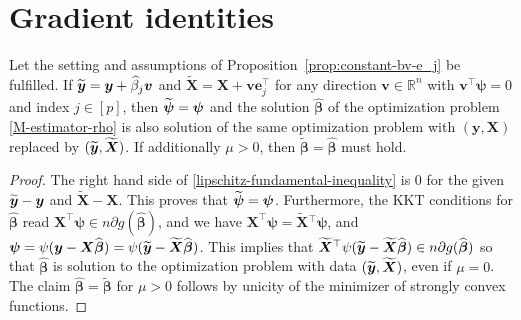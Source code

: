 \documentclass[11pt]{amsart}
\numberwithin{equation}{section}
\numberwithin{equation}{section}
\def\real{{\mathbb{R}}}
\def\R{{\real}}
\def\mathbold{\boldsymbol} %
\def\be{\mathbold{e}}
\def\bv{\mathbold{v}}\def\vhat{\widehat{v}}\def\vtil{\widetilde{v}}\def\vbar{{\overline v}}
\def\bX{\mathbold{X}}\def\hbX{{\widehat{\bX}}}\def\tbX{{\widetilde{\bX}}}\def\bXbar{{\overline \bX}}
\def\by{\mathbold{y}}\def\yhat{\widehat{y}}\def\ytil{\widetilde{y}}\def\ybar{{\overline y}}\def\vby{{\bf y}}
\def\bbeta{\mathbold{\beta}}\def\betahat{\widehat{\beta}}\def\hbeta{\widehat{\beta}}
\def\hbbeta{{{\widehat{\bbeta}}}}
\def\tbbeta{\widetilde{\bbeta}}
\def\bpsi{\mathbold{\psi}}\def\psihat{\widehat{\psi}}\def\hpsi{\widehat{\psi}}
\begin{document}
\section{Gradient identities}
\label{sec:gradient-identities}

\begin{corollary}
    \label{corollary:constant-bv-e_j}
    Let the setting
    and assumptions of Proposition~\ref{prop:constant-bv-e_j} be fulfilled.
If $\tby = \by + \hbeta_j\bv$ and
$\tbX = \bX + \bv\be_j^\top$ for any direction $\bv\in\R^n$
with $\bv^\top\bpsi = 0$ and index $j\in[p]$, then $\tbpsi=\bpsi$
and the solution $\hbbeta$ of the optimization problem \eqref{M-estimator-rho}
is also solution of the same optimization problem with
$(\by,\bX)$ replaced by $(\tby,\tbX)$.
If additionally $\mu>0$,
then $\tbbeta=\hbbeta$ must hold.
\end{corollary}
\begin{proof}
The right hand side of \eqref{lipschitz-fundamental-inequality}
is 0 for the given $\tby-\by$ and $\tbX-\bX$.
This proves that $\tbpsi=\bpsi$. Furthermore, the KKT conditions
for $\hbbeta$ read
$\bX^\top\bpsi \in n\partial g(\hbbeta)$,
and we have $\bX^\top\bpsi  = \tbX{}^\top\bpsi$,
and $\bpsi = \psi(\by-\bX\hbbeta) = \psi(\tby - \tbX\hbbeta)$.
This implies that
$\tbX{}^\top\psi(\tby-\tbX\hbbeta) \in n \partial g(\hbbeta)$
so that $\hbbeta$ is solution to the optimization problem
with data $(\tby,\tbX)$, even if $\mu=0$.
The claim $\hbbeta=\tbbeta$
for $\mu>0$ follows
by unicity of the minimizer of strongly convex functions.
\end{proof}



\end{document}
